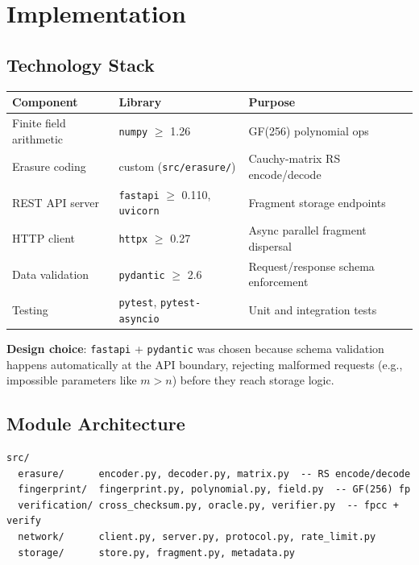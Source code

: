 \documentclass[10pt]{article}
\begin{document}
\section{Implementation}

\subsection{Technology Stack}

\begin{center}
\small
\begin{tabular}{lll}
\hline
\textbf{Component} & \textbf{Library} & \textbf{Purpose} \\
\hline
Finite field arithmetic & \texttt{numpy} $\geq$ 1.26 & GF(256) polynomial ops \\
Erasure coding & custom (\texttt{src/erasure/}) & Cauchy-matrix RS encode/decode \\
REST API server & \texttt{fastapi} $\geq$ 0.110, \texttt{uvicorn} & Fragment storage endpoints \\
HTTP client & \texttt{httpx} $\geq$ 0.27 & Async parallel fragment dispersal \\
Data validation & \texttt{pydantic} $\geq$ 2.6 & Request/response schema enforcement \\
Testing & \texttt{pytest}, \texttt{pytest-asyncio} & Unit and integration tests \\
\hline
\end{tabular}
\end{center}

\vspace{0.3em}
\textbf{Design choice}: \texttt{fastapi} + \texttt{pydantic} was chosen because schema
validation happens automatically at the API boundary, rejecting malformed requests
(e.g., impossible parameters like $m > n$) before they reach storage logic.

\subsection{Module Architecture}

\begin{lstlisting}
src/
  erasure/      encoder.py, decoder.py, matrix.py  -- RS encode/decode
  fingerprint/  fingerprint.py, polynomial.py, field.py  -- GF(256) fp
  verification/ cross_checksum.py, oracle.py, verifier.py  -- fpcc + verify
  network/      client.py, server.py, protocol.py, rate_limit.py
  storage/      store.py, fragment.py, metadata.py
\end{lstlisting}
\end{document}
